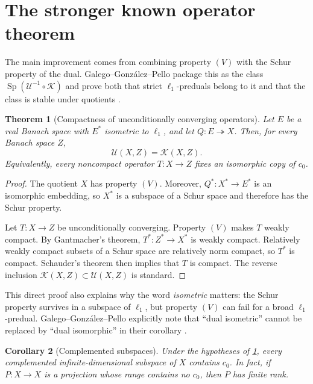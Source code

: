 \documentclass[11pt]{article}
\newtheorem{theorem}{Theorem}[section]
\newtheorem{corollary}[theorem]{Corollary}
\theoremstyle{definition}
\newcommand{\cU}{\mathcal U}
\newcommand{\cK}{\mathcal K}
\newcommand{\onto}{\twoheadrightarrow}
\newcommand{\SpUK}{\operatorname{Sp}(\cU^{-1}\circ\cK)}
\begin{document}
\section{The stronger known operator theorem}

The main improvement comes from combining property $(V)$ with the Schur
property of the dual.  Galego--Gonz\'alez--Pello package this as the class
$\SpUK$ and prove both that strict $\ell_1$-preduals belong to it and that the
class is stable under quotients \cite[Corollary~3.5 and
Proposition~3.6]{GalegoGonzalezPello2017}.

\begin{theorem}[Compactness of unconditionally converging operators]
\label{thm:UK}
Let $E$ be a real Banach space with $E^*$ isometric to $\ell_1$, and let
$Q:E\onto X$.  Then, for every Banach space $Z$,
\[
   \cU(X,Z)=\cK(X,Z).
\]
Equivalently, every noncompact operator $T:X\to Z$ fixes an isomorphic copy of
$c_0$.
\end{theorem}

\begin{proof}
The quotient $X$ has property $(V)$.  Moreover, $Q^*:X^*\to E^*$ is an
isomorphic embedding, so $X^*$ is a subspace of a Schur space and therefore
has the Schur property.

Let $T:X\to Z$ be unconditionally converging.  Property $(V)$ makes $T$
weakly compact.  By Gantmacher's theorem, $T^*:Z^*\to X^*$ is weakly
compact.  Relatively weakly compact subsets of a Schur space are relatively
norm compact, so $T^*$ is compact.  Schauder's theorem then implies that $T$
is compact.  The reverse inclusion $\cK(X,Z)\subset\cU(X,Z)$ is standard.
\end{proof}

This direct proof also explains why the word \emph{isometric} matters: the
Schur property survives in a subspace of $\ell_1$, but property $(V)$ can fail
for a broad $\ell_1$-predual.  Galego--Gonz\'alez--Pello explicitly note that
``dual isometric'' cannot be replaced by ``dual isomorphic'' in their
corollary \cite[Corollary~3.5]{GalegoGonzalezPello2017}.

\begin{corollary}[Complemented subspaces]\label{cor:complemented}
Under the hypotheses of \cref{thm:UK}, every complemented
infinite-dimensional subspace of $X$ contains $c_0$.  In fact, if $P:X\to X$
is a projection whose range contains no $c_0$, then $P$ has finite rank.
\end{corollary}
\end{document}
